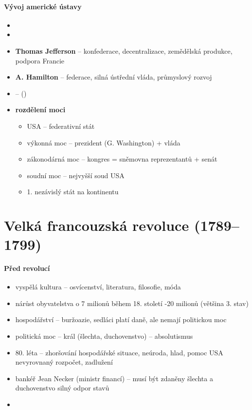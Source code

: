\paragraph{Vývoj americké ústavy}
\begin{itemize}
\item {}
\item {}
\item \textbf{Thomas Jefferson} -- konfederace, decentralizace, zemědělská produkce, podpora Francie
\item \textbf{A. Hamilton} -- federace, silná ústřední vláda, průmyslový rozvoj
\item {} -- ()
\item \textbf{rozdělení moci}
	\begin{itemize}
	\item USA -- federativní stát
	\item výkonná moc -- prezident (G. Washington) + vláda
	\item zákonodárná moc -- kongres = sněmovna reprezentantů + senát
	\item soudní moc -- nejvyšší soud USA
	\item 1. nezávislý stát na kontinentu
	\end{itemize}
\end{itemize}




\section{Velká francouzská revoluce (1789--1799)}
\paragraph{Před revolucí}
\begin{itemize}
\item vyspělá kultura -- osvícenství, literatura, filosofie, móda
\item nárůst obyvatelstva o 7 milionů během 18. století -20 milionů (většina 3. stav)
\item hospodářství -- buržoazie, sedláci platí daně, ale nemají politickou moc
\item politická moc -- král (šlechta, duchovenstvo) -- absolutismus
\item 80. léta -- zhoršování hospodářské situace, neúroda, hlad, pomoc USA
\ra nevyrovnaný rozpočet, zadlužení
\item bankéř Jean Necker (ministr financí) -- musí být zdaněny šlechta a duchovenstvo \ra silný odpor stavů
\item {}

\end{itemize}

